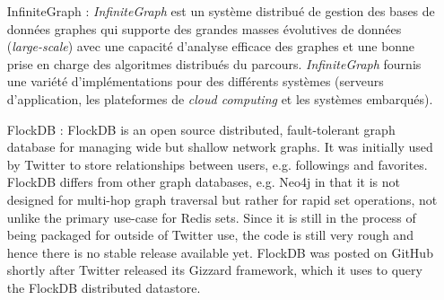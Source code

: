 \begin{itemize}
    \item [InfiniteGraph]: \emph{InfiniteGraph} \cite{infinitegraph}
      est un système distribué de gestion des bases de données graphes
      qui supporte des grandes masses évolutives de données
      (\emph{large-scale}) avec une capacité d'analyse efficace des
      graphes et une bonne prise en charge des algoritmes distribués
      du parcours. \emph{InfiniteGraph} fournis une variété
      d'implémentations pour des différents systèmes (serveurs
      d'application, les plateformes de \emph{cloud computing} et les
      systèmes embarqués).

    \item [FlockDB]: FlockDB \cite{flockdb} is an open source
      distributed, fault-tolerant graph database for managing wide but
      shallow network graphs. It was initially used by Twitter to
      store relationships between users, e.g. followings and
      favorites. FlockDB differs from other graph databases,
      e.g. Neo4j in that it is not designed for multi-hop graph
      traversal but rather for rapid set operations, not unlike the
      primary use-case for Redis sets. Since it is still in the
      process of being packaged for outside of Twitter use, the code
      is still very rough and hence there is no stable release
      available yet. FlockDB was posted on GitHub shortly after
      Twitter released its Gizzard framework, which it uses to query
      the FlockDB distributed datastore.
    \end{itemize}

    

